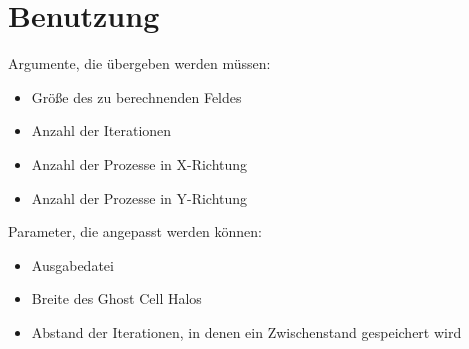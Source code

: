 \documentclass[12pt]{article}
\begin{document}
\section{Benutzung}
Argumente, die übergeben werden müssen:
\begin{itemize}
    \item Größe des zu berechnenden Feldes
    \item Anzahl der Iterationen
    \item Anzahl der Prozesse in X-Richtung
    \item Anzahl der Prozesse in Y-Richtung
\end{itemize}
Parameter, die angepasst werden können:
\begin{itemize}
    \item Ausgabedatei
    \item Breite des Ghost Cell Halos
    \item Abstand der Iterationen, in denen ein Zwischenstand gespeichert wird
\end{itemize}

\typeout{}
\clearpage
\pagestyle{empty}

% 
\end{document}
